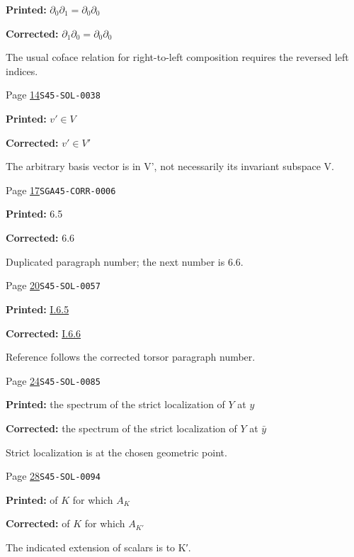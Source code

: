\begin{description}
\par\noindent\textbf{Printed:} \(\partial_0\partial_1=\partial_0\partial_0\)
\par\noindent\textbf{Corrected:} \(\partial_1\partial_0=\partial_0\partial_0\)
\par\noindent The usual coface relation for right-to-left composition requires the reversed left indices.
\smallskip
\item[\hypertarget{apparatus:EN-0006}{6}] Page \hyperlink{printpage:en:14}{14}\quad\texttt{S45-SOL-0038}
\par\noindent\textbf{Printed:} \(v'\in V\)
\par\noindent\textbf{Corrected:} \(v'\in V'\)
\par\noindent The arbitrary basis vector is in V', not necessarily its invariant subspace V.
\smallskip
\item[\hypertarget{apparatus:EN-0007}{7}] Page \hyperlink{printpage:en:17}{17}\quad\texttt{SGA45-CORR-0006}
\par\noindent\textbf{Printed:} 6.5
\par\noindent\textbf{Corrected:} 6.6
\par\noindent Duplicated paragraph number; the next number is 6.6.
\smallskip
\item[\hypertarget{apparatus:EN-0008}{8}] Page \hyperlink{printpage:en:20}{20}\quad\texttt{S45-SOL-0057}
\par\noindent\textbf{Printed:} \hyperref[I:1-6-6]{I.6.5}
\par\noindent\textbf{Corrected:} \hyperref[I:1-6-6]{I.6.6}
\par\noindent Reference follows the corrected torsor paragraph number.
\smallskip
\item[\hypertarget{apparatus:EN-0009}{9}] Page \hyperlink{printpage:en:24}{24}\quad\texttt{S45-SOL-0085}
\par\noindent\textbf{Printed:} the spectrum of the strict localization of $Y$ at $y$
\par\noindent\textbf{Corrected:} the spectrum of the strict localization of $Y$ at $\bar y$
\par\noindent Strict localization is at the chosen geometric point.
\smallskip
\item[\hypertarget{apparatus:EN-0010}{10}] Page \hyperlink{printpage:en:28}{28}\quad\texttt{S45-SOL-0094}
\par\noindent\textbf{Printed:} of $K$ for which $A_K$
\par\noindent\textbf{Corrected:} of $K$ for which $A_{K'}$
\par\noindent The indicated extension of scalars is to K′.

\end{description}
